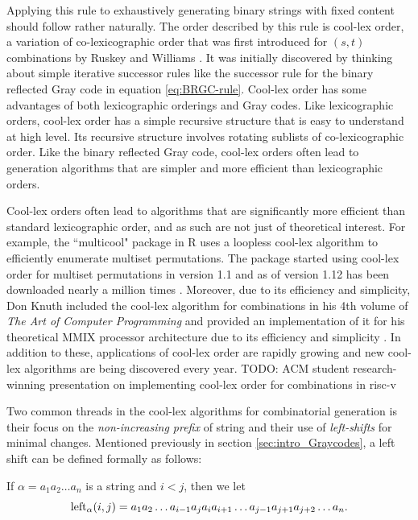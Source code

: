 Applying this rule to exhaustively generating binary strings with fixed content should follow rather naturally.  The order described by this rule is 
cool-lex order, a variation of co-lexicographic order that was first introduced for $(s,t)$ combinations by Ruskey and Williams \cite{ruskey2005generating} \cite{ruskey2008generating}.  It was initially discovered by thinking about simple iterative successor rules like the successor rule for the binary reflected Gray code in equation \ref{eq:BRGC-rule}. Cool-lex order has some advantages of both lexicographic orderings and Gray codes.  Like lexicographic orders, cool-lex order has a simple recursive structure that is easy to understand at  high level.  Its recursive structure involves rotating sublists of co-lexicographic order.  Like the binary reflected Gray code, cool-lex orders often lead to generation algorithms that are simpler and more efficient than lexicographic orders.   %

Cool-lex orders often lead to algorithms that are significantly more efficient than standard lexicographic order, and as such are not just of theoretical interest.  For example, the ``multicool" package in R uses a loopless cool-lex algorithm to efficiently enumerate multiset permutations.   The package started using cool-lex order for multiset permutations in version 1.1 and as of version 1.12 has been downloaded nearly a million times \cite{multicool_2021}.  Moreover, due to its efficiency and simplicity, Don Knuth included the cool-lex algorithm for combinations in his 4th volume of \emph{The Art of Computer Programming} and provided an implementation of it for his theoretical MMIX processor architecture due to its efficiency and simplicity \cite{knuth2015art}.  In addition to these, applications of cool-lex order are rapidly growing and new cool-lex algorithms are being discovered every year.  
TODO: ACM student research-winning presentation on implementing cool-lex order for combinations in risc-v

Two common threads in the cool-lex algorithms for combinatorial generation is their focus on the \emph{non-increasing prefix} of string and their use of \emph{left-shifts} for minimal changes.  Mentioned previously in section \ref{sec:intro_Graycodes}, a left shift can be defined formally as follows:

If $\alpha = a_1 a_2 \ldots a_n$ is a string and $i < j$, then we let
\begin{equation}
    \lshiftindex[\alpha]{i}{j} = a_1 a_2 \ldots a_{i-1} a_j a_{i} a_{i+1} \ldots a_{j-1} a_{j+1} a_{j+2} \ldots a_n. \label{eq:leftdef}
\end{equation}

